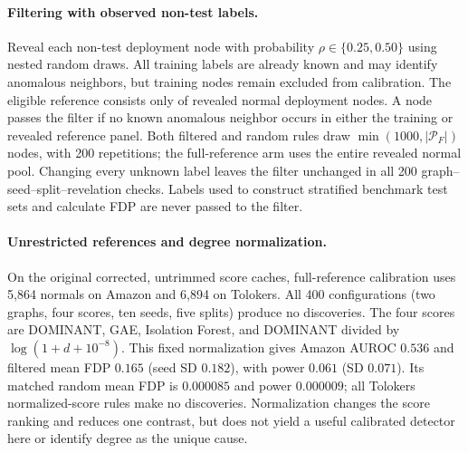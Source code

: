 \begin{table}[t]
\centering\scriptsize
\caption{Complete supervised oracle-filter comparison. FDP and power are mean $\pm$ SD of ten training-seed averages; discoveries and calibration size $n$ are means. Full-reference and matched comparisons share test sets but differ in reference size.}
\label{tab:supervisedfull}
\end{table}

\paragraph{Filtering with observed non-test labels.}
Reveal each non-test deployment node with probability $\rho\in\{0.25,0.50\}$ using nested random draws. All training labels are already known and may identify anomalous neighbors, but training nodes remain excluded from calibration. The eligible reference consists only of revealed normal deployment nodes. A node passes the filter if no known anomalous neighbor occurs in either the training or revealed reference panel. Both filtered and random rules draw $\min(1000,|\mathcal P_F|)$ nodes, with 200 repetitions; the full-reference arm uses the entire revealed normal pool. Changing every unknown label leaves the filter unchanged in all 200 graph--seed--split--revelation checks. Labels used to construct stratified benchmark test sets and calculate FDP are never passed to the filter.

\begin{table}[t]
\centering\scriptsize
\caption{All supervised partial-label comparisons. FDP and power are mean $\pm$ seed SD. ``Labels'' counts the mean revealed non-test deployment labels, including normal and anomalous nodes; add 864 training labels for Amazon or 1,176 for Tolokers. Thus these comparisons are not equal-label-budget alternatives to direct batch certification.}
\label{tab:supervisedpartial}
\end{table}

\paragraph{Unrestricted references and degree normalization.}
On the original corrected, untrimmed score caches, full-reference calibration uses 5,864 normals on Amazon and 6,894 on Tolokers. All 400 configurations (two graphs, four scores, ten seeds, five splits) produce no discoveries. The four scores are DOMINANT, GAE, Isolation Forest, and DOMINANT divided by $\log(1+d+10^{-8})$. This fixed normalization gives Amazon AUROC $0.536$ and filtered mean FDP $0.165$ (seed SD $0.182$), with power $0.061$ (SD $0.071$). Its matched random mean FDP is $0.000085$ and power $0.000009$; all Tolokers normalized-score rules make no discoveries. Normalization changes the score ranking and reduces one contrast, but does not yield a useful calibrated detector here or identify degree as the unique cause.

